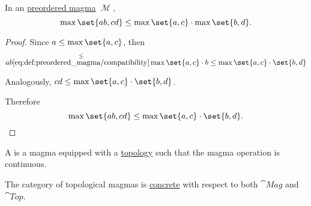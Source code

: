 \begin{proposition}\label{thm:preordered_magma_max_distributivity}
  In an \hyperref[def:preordered_magma]{preordered magma} \( \mscrM \),
  \begin{equation}\label{eq:thm:preordered_magma_max_distributivity}
    \max \set{a b, c d} \leq \max \set{a, c} \cdot \max \set{b, d}.
  \end{equation}
\end{proposition}
\begin{proof}
  Since \( a \leq \max \set{a, c} \), then
  \begin{equation*}
    ab
    \overset \leq {\eqref{eq:def:preordered_magma/compatibility}}
    \max \set{a, c} \cdot b
    \leq
    \max \set{a, c} \cdot \set{b, d}
  \end{equation*}

  Analogously, \( cd \leq \max \set{a, c} \cdot \set{b, d} \).

  Therefore
  \begin{equation}
    \max \set{a b, c d} \leq \max \set{a, c} \cdot \set{b, d}.
  \end{equation}
\end{proof}

\begin{definition}\label{def:topological_magma}
  A  is a magma equipped with a \hyperref[def:topological_space]{topology} such that the magma operation is continuous.

  The category of topological magmas is \hyperref[def:concrete_category]{concrete} with respect to both \( \cat{Mag} \) and \hyperref[def:category_of_topological_spaces]{\( \cat{Top} \)}.
\end{definition}
